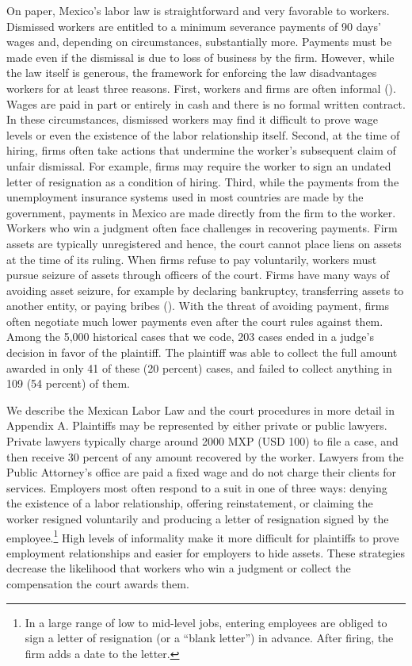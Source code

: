 \documentclass[11pt, a4paper]{article}
\begin{document}
 On paper, Mexico's labor law is straightforward and very favorable to workers. Dismissed workers are entitled to a minimum severance payments of 90 days' wages and, depending on circumstances, substantially more. Payments must be made even if the dismissal is due to loss of business by the firm. However, while the law itself is generous, the framework for enforcing the law disadvantages workers for at least three reasons. First, workers and firms are often informal (\cite{Verhoogan_IMSS}). Wages are paid in part or entirely in cash and there is no formal written contract. In these circumstances, dismissed workers may find it difficult to prove wage levels or even the existence of the labor relationship itself. Second, at the time of hiring, firms often take actions that undermine the worker's subsequent claim of unfair dismissal. For example, firms may require the worker to sign an undated letter of resignation as a condition of hiring. Third, while the  payments from the unemployment insurance systems used in most countries are made by the government, payments in Mexico are made directly from the firm to the worker. Workers who win a judgment often face challenges in recovering payments. Firm assets are typically unregistered and hence, the court cannot place liens on assets at the time of its ruling. When firms refuse to pay voluntarily, workers must pursue seizure of assets through officers of the court. Firms have many ways of avoiding asset seizure, for example by declaring bankruptcy, transferring assets to another entity, or paying bribes (\cite{KaplanSadka_notif}). With the threat of avoiding payment, firms often negotiate much lower payments even after the court rules against them. Among the 5,000 historical cases that we code, 203 cases ended in a judge's decision in favor of the plaintiff. The plaintiff was able to collect the full amount awarded in only 41 of these (20 percent) cases, and failed to collect anything in 109 (54 percent) of them.

We describe the Mexican Labor Law and the court procedures in more detail in Appendix A. Plaintiffs may be represented by either private or public lawyers. Private lawyers typically charge around 2000 MXP (USD 100) to file a case, and then receive 30 percent of any amount recovered by the worker. Lawyers from the Public Attorney's office are paid a fixed wage and do not charge their clients for services. Employers most often respond to a suit in one of three ways: denying the existence of a labor relationship, offering reinstatement, or claiming the worker resigned voluntarily and producing a letter of resignation signed by the employee.\footnote{In a large range of low to mid-level jobs, entering employees are obliged to sign a letter of resignation (or a ``blank letter'') in advance. After firing, the firm adds a date to the letter.} High levels of informality make it more difficult for plaintiffs to prove employment relationships and easier for employers to hide assets. These strategies decrease the likelihood that workers who win a judgment or collect the compensation the court awards them.
\end{document}
